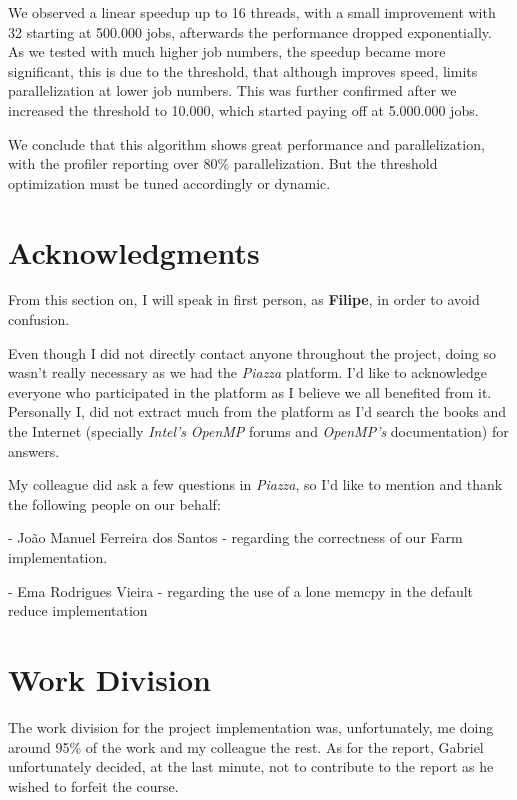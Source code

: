 \documentclass[10pt,journal]{IEEEtran}
\begin{document}
We observed a linear speedup up to 16 threads, with a small improvement with 32 starting at 500.000 jobs, afterwards the performance dropped exponentially. As we tested with much higher job numbers, the speedup became more significant, this is due to the threshold, that although improves speed, limits parallelization at lower job numbers. This was further confirmed after we increased the threshold to 10.000, which started paying off at 5.000.000 jobs.

We conclude that this algorithm shows great performance and parallelization, with the profiler reporting over 80\% parallelization. But the threshold optimization must be tuned accordingly or dynamic.

\section{Acknowledgments}

From this section on, I will speak in first person, as \textbf{Filipe}, in order to avoid confusion.

Even though I did not directly contact anyone throughout the project, doing so wasn't really necessary as we had the \textit{Piazza} platform. I'd like to acknowledge everyone who participated in the platform as I believe we all benefited from it. Personally I, did not extract much from the platform as I'd search the books and the Internet (specially \textit{Intel's} \textit{OpenMP} forums and \textit{OpenMP's} documentation) for answers.

My colleague did ask a few questions in \textit{Piazza}, so I'd like to mention and thank the following people on our behalf:

- João Manuel Ferreira dos Santos - regarding the correctness of our Farm implementation.

- Ema Rodrigues Vieira - regarding the use of a lone memcpy in the default reduce implementation


{}

\section{Work Division}

The work division for the project implementation was, unfortunately, me doing around 95\% of the work and my colleague the rest. As for the report, Gabriel unfortunately decided, at the last minute, not to contribute to the report as he wished to forfeit the course.
\end{document}
